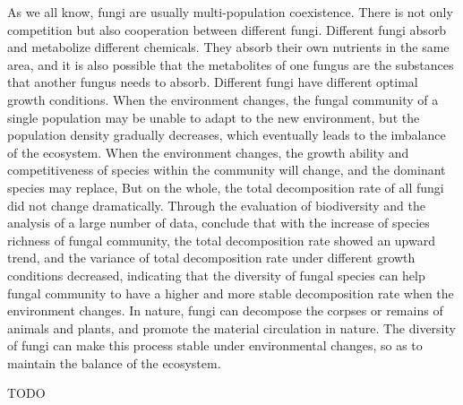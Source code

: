 \documentclass{mcmthesis}
\begin{document}
\begin{appendices}
As we all know, fungi are usually multi-population coexistence. There is not only competition but also cooperation between different fungi. Different fungi absorb and metabolize different chemicals. They absorb their own nutrients in the same area, and it is also possible that the metabolites of one fungus are the substances that another fungus needs to absorb. Different fungi have different optimal growth conditions. When the environment changes, the fungal community of a single population may be unable to adapt to the new environment, but the population density gradually decreases, which eventually leads to the imbalance of the ecosystem. When the environment changes, the growth ability and competitiveness of species within the community will change, and the dominant species may replace, But on the whole, the total decomposition rate of all fungi did not change dramatically. Through the evaluation of biodiversity and the analysis of a large number of data, conclude that with the increase of species richness of fungal community, the total decomposition rate showed an upward trend, and the variance of total decomposition rate under different growth conditions decreased, indicating that the diversity of fungal species can help fungal community to have a higher and more stable decomposition rate when the environment changes. In nature, fungi can decompose the corpses or remains of animals and plants, and promote the material circulation in nature. The diversity of fungi can make this process stable under environmental changes, so as to maintain the balance of the ecosystem.

TODO




% 
\end{appendices}
\end{document}
